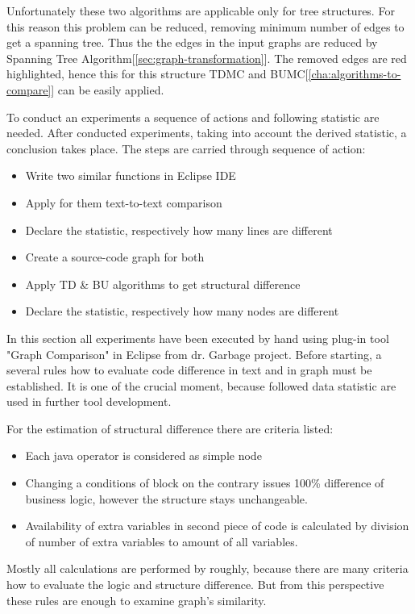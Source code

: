 \documentclass{report}
\begin{document}
Unfortunately these two algorithms are applicable only for tree structures. For this reason this problem can be reduced, removing minimum number of edges to get a spanning tree. Thus the the edges in the input graphs are reduced by Spanning Tree Algorithm[\ref{sec:graph-transformation}]. The removed edges are red highlighted, hence this for this structure TDMC and BUMC[\ref{cha:algorithms-to-compare}] can be easily applied.

To conduct an experiments a sequence of actions and following statistic are needed. After conducted experiments, taking into account the derived statistic, a conclusion takes place. The steps are carried through sequence of action:
\begin{itemize}
	\item Write two similar functions in Eclipse IDE
	\item Apply for them text-to-text comparison
	\item Declare the statistic, respectively how many lines are different		
	\item Create a source-code graph for both
	\item Apply TD \& BU algorithms to get structural difference	
	\item Declare the statistic, respectively how many nodes are different			
\end{itemize}

In this section all experiments have been executed by hand using plug-in tool "Graph Comparison" in Eclipse from dr. Garbage project. Before starting, a several rules how to evaluate code difference in text and in graph must be established. It is one of the crucial moment, because followed data statistic are used in further tool development.

For the estimation of structural difference there are criteria listed:
\begin{itemize}
	\item Each java operator is considered as simple node
	\item Changing a conditions of block on the contrary issues 100\% difference of business logic, however the structure stays unchangeable.
	\item Availability of extra variables in second piece of code is calculated by division of number of extra variables to amount of all variables.
\end{itemize}

Mostly all calculations are performed by roughly, because there are many criteria how to evaluate the logic and structure difference. But from this perspective these rules are enough to examine graph's similarity.
\end{document}
